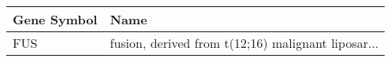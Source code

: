 \begin{tabular}{ll}
\toprule
Gene Symbol &                                               Name \\
\midrule
        FUS & fusion, derived from t(12;16) malignant liposar... \\
\bottomrule
\end{tabular}
